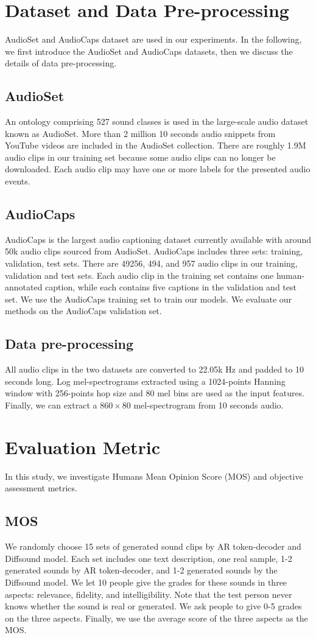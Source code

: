 \documentclass[lettersize,journal]{IEEEtran}
\begin{document}
\section{Dataset and Data Pre-processing}
AudioSet \cite{gemmeke2017audio} and AudioCaps \cite{kim2019audiocaps} dataset are used in our experiments. In the following, we first introduce the AudioSet and AudioCaps datasets, then we discuss the details of data pre-processing.
\subsection{AudioSet} 
An ontology comprising 527 sound classes is used in the large-scale audio dataset known as AudioSet. More than 2 million 10 seconds audio snippets from YouTube videos are included in the AudioSet collection. There are roughly 1.9M audio clips in our training set because some audio clips can no longer be downloaded. Each audio clip may have one or more labels for the presented audio events.
\subsection{AudioCaps} AudioCaps is the largest audio captioning dataset currently available with around 50k audio clips sourced from AudioSet. AudioCaps includes three sets: training, validation, test sets. There are 49256, 494, and 957 audio clips in our training, validation and test sets. Each audio clip in the training set contains one human-annotated caption, while each contains five captions in the validation and test set. We use the AudioCaps training set to train our models. We evaluate our methods on the AudioCaps validation set. 
\subsection{Data pre-processing}
All audio clips in the two datasets are converted to 22.05k Hz and
padded to 10 seconds long. Log mel-spectrograms extracted using a 1024-points Hanning window with 256-points hop size and 80 mel bins
are used as the input features. Finally, we can extract a $860 \times 80$ mel-spectrogram from 10 seconds audio. 
\section{Evaluation Metric} \label{sec:evaluation metrix}
In this study, we investigate Humans Mean Opinion Score (MOS) and objective assessment metrics.
\subsection{MOS} We randomly choose 15 sets of generated sound clips by AR token-decoder and Diffsound model. Each set includes one text description, one real sample, 1-2 generated sounds by AR token-decoder, and 1-2 generated sounds by the Diffsound model. We let 10 people give the grades for these sounds in three aspects: relevance, fidelity, and intelligibility. Note that the test person never knows whether the sound is real or generated. We ask people to give 0-5 grades on the three aspects. Finally, we use the average score of the three aspects as the MOS.
\end{document}
